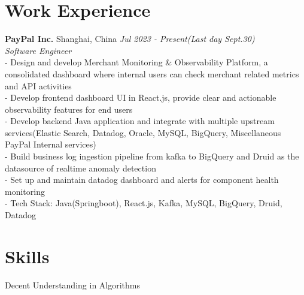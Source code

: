 \documentclass[11pt]{article}
\newif\ifiang
\newif\ifwebthree
\begin{document}
\section*{Work Experience}

{\fontsize{13}{13}\selectfont\textbf{PayPal Inc.}} Shanghai, China \hfill \textit{Jul 2023 - Present(Last day Sept.30)} \\
\textit{Software Engineer} \\[0.2em]
- Design and develop Merchant Monitoring \& Observability Platform, a consolidated dashboard where internal users can check merchant related metrics and API activities\\
- Develop frontend dashboard UI in React.js, provide clear and actionable observability features for end users \\
- Develop backend Java application and integrate with multiple upstream services(Elastic Search, Datadog, Oracle, MySQL, BigQuery, Miscellaneous PayPal Internal services) \\
- Build business log ingestion pipeline from kafka to BigQuery and Druid as the datasource of realtime anomaly detection \\ 
- Set up and maintain datadog dashboard and alerts for component health monitoring \\
- Tech Stack: Java(Springboot), React.js, Kafka, MySQL, BigQuery, Druid, Datadog \\

\section*{Skills}
Decent Understanding in Algorithms \\
\noindent
{} 
 \\
\noindent
{}
 \\
\ifwebthree
\noindent
\tcbox[skillbox]{ethers.js}
\tcbox[skillbox]{Solidity} \\
\fi
\noindent
{}
\end{document}
